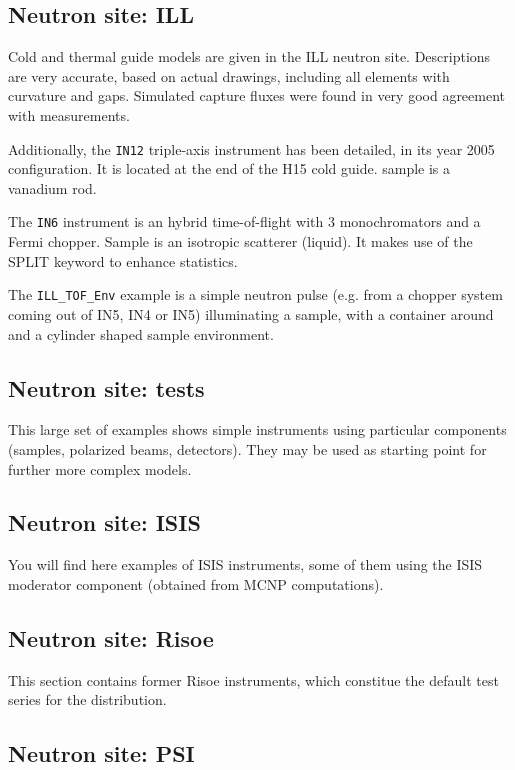 \subsection{Neutron site: ILL}

Cold and thermal guide models are given in the ILL neutron site. Descriptions are very accurate, based on actual drawings, including all elements with curvature and gaps. Simulated capture fluxes were found in very good agreement with measurements.

Additionally, the \verb+IN12+ triple-axis instrument has been detailed, in its year 2005 configuration. It is located at the end of the H15 cold guide. sample is a vanadium rod.

The \verb+IN6+ instrument is an hybrid time-of-flight with 3 monochromators and a Fermi chopper. Sample is an isotropic scatterer (liquid). It makes use of the SPLIT keyword to enhance statistics.

The \verb+ILL_TOF_Env+ example is a simple neutron pulse (e.g. from a chopper system coming out of IN5, IN4 or IN5) illuminating a sample, with a container around and a cylinder shaped sample environment.

\subsection{Neutron site: tests}

This large set of examples shows simple instruments using particular components (samples, polarized beams, detectors). They may be used as starting point for further more complex models.

\subsection{Neutron site: ISIS}

You will find here examples of ISIS instruments, some of them using the ISIS moderator component (obtained from MCNP computations).

\subsection{Neutron site: Risoe}

This section contains former Risoe instruments, which constitue the default test series for the \MCS distribution.

\subsection{Neutron site: PSI}

